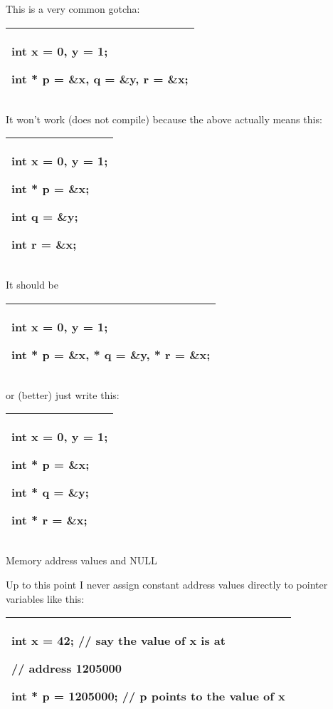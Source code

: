 \documentclass[
]{article}
\begin{document}
This is a very common gotcha:

\begin{longtable}[]{@{}l@{}}
\toprule
\endhead
\begin{minipage}[t]{0.97\columnwidth}\raggedright
int x = 0, y = 1;

int * p = \&x, q = \&y, r = \&x;\strut
\end{minipage}\tabularnewline
\bottomrule
\end{longtable}

It won't work (does not compile) because the above actually means this:

\begin{longtable}[]{@{}l@{}}
\toprule
\endhead
\begin{minipage}[t]{0.97\columnwidth}\raggedright
int x = 0, y = 1;

int * p = \&x;

int q = \&y;

int r = \&x;\strut
\end{minipage}\tabularnewline
\bottomrule
\end{longtable}

It should be

\begin{longtable}[]{@{}l@{}}
\toprule
\endhead
\begin{minipage}[t]{0.97\columnwidth}\raggedright
int x = 0, y = 1;

int * p = \&x, * q = \&y, * r = \&x;\strut
\end{minipage}\tabularnewline
\bottomrule
\end{longtable}

or (better) just write this:

\begin{longtable}[]{@{}l@{}}
\toprule
\endhead
\begin{minipage}[t]{0.97\columnwidth}\raggedright
int x = 0, y = 1;

int * p = \&x;

int * q = \&y;

int * r = \&x;\strut
\end{minipage}\tabularnewline
\bottomrule
\end{longtable}

Memory address values and NULL

Up to this point I never assign constant address values directly to
pointer variables like this:

\begin{longtable}[]{@{}l@{}}
\toprule
\endhead
\begin{minipage}[t]{0.97\columnwidth}\raggedright
int x = 42; // say the value of x is at

// address 1205000

int * p = 1205000; // p points to the value of x\strut
\end{minipage}\tabularnewline
\bottomrule
\end{longtable}
\end{document}
